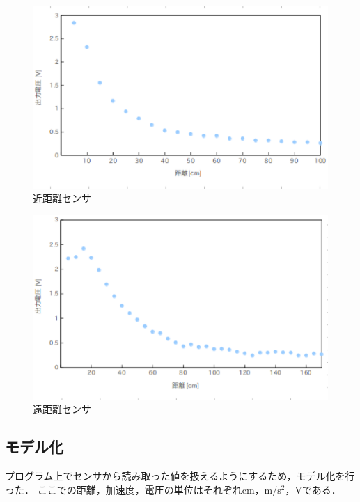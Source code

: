 \documentclass[11pt,a4]{jsarticle}
\begin{document}
\newpage
\begin{figure}[htb]
  \begin{center}
    \includegraphics[width=1.0\hsize]{picture/psdn.eps}
    \caption{近距離センサ}
    \label{psdn}
  \end{center}
\end{figure}

\begin{figure}[H]
  \begin{center}
    \includegraphics[width=1.0\hsize]{picture/psdf.eps}
    \caption{遠距離センサ}
    \label{psdf}
  \end{center}
\end{figure}


\subsection{モデル化}
プログラム上でセンサから読み取った値を扱えるようにするため，モデル化を行った．
ここでの距離，加速度，電圧の単位はそれぞれcm，$\mathrm{m}/\mathrm{s}^{2}$，Vである．
\end{document}
